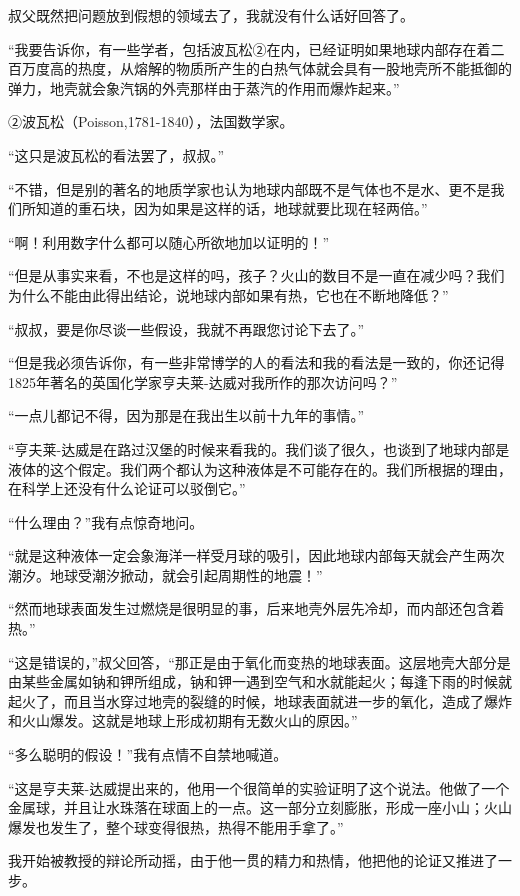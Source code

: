 \documentclass[10pt]{book}
\begin{document}
叔父既然把问题放到假想的领域去了，我就没有什么话好回答了。

“我要告诉你，有一些学者，包括波瓦松②在内，已经证明如果地球内部存在着二百万度高的热度，从熔解的物质所产生的白热气体就会具有一股地壳所不能抵御的弹力，地壳就会象汽锅的外壳那样由于蒸汽的作用而爆炸起来。”

②波瓦松（Poisson,1781-1840），法国数学家。

“这只是波瓦松的看法罢了，叔叔。”

“不错，但是别的著名的地质学家也认为地球内部既不是气体也不是水、更不是我们所知道的重石块，因为如果是这样的话，地球就要比现在轻两倍。”

“啊！利用数字什么都可以随心所欲地加以证明的！”

“但是从事实来看，不也是这样的吗，孩子？火山的数目不是一直在减少吗？我们为什么不能由此得出结论，说地球内部如果有热，它也在不断地降低？”

“叔叔，要是你尽谈一些假设，我就不再跟您讨论下去了。”

“但是我必须告诉你，有一些非常博学的人的看法和我的看法是一致的，你还记得1825年著名的英国化学家亨夫莱-达威对我所作的那次访问吗？”

“一点儿都记不得，因为那是在我出生以前十九年的事情。”

“亨夫莱-达威是在路过汉堡的时候来看我的。我们谈了很久，也谈到了地球内部是液体的这个假定。我们两个都认为这种液体是不可能存在的。我们所根据的理由，在科学上还没有什么论证可以驳倒它。”

“什么理由？”我有点惊奇地问。

“就是这种液体一定会象海洋一样受月球的吸引，因此地球内部每天就会产生两次潮汐。地球受潮汐掀动，就会引起周期性的地震！”

“然而地球表面发生过燃烧是很明显的事，后来地壳外层先冷却，而内部还包含着热。”

“这是错误的，”叔父回答，“那正是由于氧化而变热的地球表面。这层地壳大部分是由某些金属如钠和钾所组成，钠和钾一遇到空气和水就能起火；每逢下雨的时候就起火了，而且当水穿过地壳的裂缝的时候，地球表面就进一步的氧化，造成了爆炸和火山爆发。这就是地球上形成初期有无数火山的原因。”

“多么聪明的假设！”我有点情不自禁地喊道。

“这是亨夫莱-达威提出来的，他用一个很简单的实验证明了这个说法。他做了一个金属球，并且让水珠落在球面上的一点。这一部分立刻膨胀，形成一座小山；火山爆发也发生了，整个球变得很热，热得不能用手拿了。”

我开始被教授的辩论所动摇，由于他一贯的精力和热情，他把他的论证又推进了一步。
\end{document}
